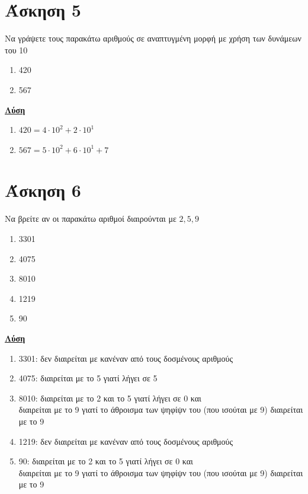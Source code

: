 \documentclass[a4paper,10pt]{report}
\begin{document}
\section*{Άσκηση 5  \hfill \small{}}
Να γράψετε τους παρακάτω αριθμούς σε αναπτυγμένη μορφή με χρήση των δυνάμεων του 10
\begin{enumerate}[1)]
 \item 420
 \item 567
\end{enumerate}
\underline{\textbf{Λύση}}\\
\begin{enumerate}[1)]
 \item $420=4\cdot 10^{2}+2\cdot 10^{1}$
 \item $567=5\cdot10^{2}+6\cdot10^{1}+7$
\end{enumerate}

\section*{Άσκηση 6  \hfill \small{}}
Να βρείτε αν οι παρακάτω αριθμοί διαιρούνται με $2,5,9$
\begin{enumerate}[1)]
 \item 3301
 \item 4075
 \item 8010
 \item 1219
 \item 90
\end{enumerate}
\underline{\textbf{Λύση}}\\ 
\begin{enumerate}[1)]
 \item 3301: δεν διαιρείται με κανέναν από τους δοσμένους αριθμούς
 \item 4075: διαιρείται με το 5 γιατί λήγει σε 5
 \item 8010: διαιρείται με το 2 και το 5 γιατί λήγει σε 0 και \\
 διαιρείται με το 9 γιατί το άθροισμα των ψηφίψν του (που ισούται με 9) διαιρείται με το 9
 \item 1219: δεν διαιρείται με κανέναν από τους δοσμένους αριθμούς
 \item 90: διαιρείται με το 2 και το 5 γιατί λήγει σε 0 και \\
 διαιρείται με το 9 γιατί το άθροισμα των ψηφίψν του (που ισούται με 9) διαιρείται με το 9
\end{enumerate}
\end{document}
